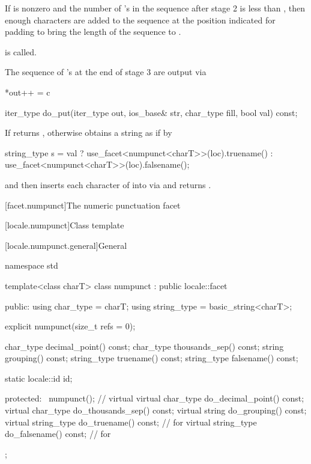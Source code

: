 \begin{itemdescr}
\begin{description}
If  is nonzero and the number of 's
in the sequence after stage 2 is less than ,
then enough  characters are added to the sequence
at the position indicated for padding
to bring the length of the sequence to .

 is called.

The sequence of 's at the end of stage 3 are output via
\begin{codeblock}
*out++ = c
\end{codeblock}
\end{description}
\end{itemdescr}

%
\begin{itemdecl}
iter_type do_put(iter_type out, ios_base& str, char_type fill, bool val) const;
\end{itemdecl}

\begin{itemdescr}
\pnum
\returns
If 
returns ,
otherwise obtains a string  as if by
\begin{codeblock}
string_type s =
  val ? use_facet<numpunct<charT>>(loc).truename()
      : use_facet<numpunct<charT>>(loc).falsename();
\end{codeblock}
and then inserts each character  of  into 
via 
and returns .
\end{itemdescr}

[facet.numpunct]{The numeric punctuation facet}

[locale.numpunct]{Class template }

[locale.numpunct.general]{General}

%
\begin{codeblock}
namespace std {
  template<class charT>
    class numpunct : public locale::facet {
    public:
      using char_type   = charT;
      using string_type = basic_string<charT>;

      explicit numpunct(size_t refs = 0);

      char_type   decimal_point() const;
      char_type   thousands_sep() const;
      string      grouping()      const;
      string_type truename()      const;
      string_type falsename()     const;

      static locale::id id;

    protected:
      ~numpunct();                                              // virtual
      virtual char_type   do_decimal_point() const;
      virtual char_type   do_thousands_sep() const;
      virtual string      do_grouping()      const;
      virtual string_type do_truename()      const;             // for 
      virtual string_type do_falsename()     const;             // for 
    };
}
\end{codeblock}

